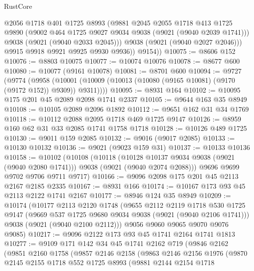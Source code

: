 \begin{lexlean}{RustCore}
\begin{coremodule}
              @2056
              @1718
              @401
              @1725
              @8993
              (@9881
                @2045
                @2055
                @1718
                @413
                @1725
                @9890
                (@9002 @464 @1725 @9027 @9034 @9038 (@9021 (@9040 @2039 @1741)))
                @9038
                (@9021 (@9040 @2033 @2045)))
              @9038
              (@9021 (@9040 @2027 @2046)))
            @9915
            @9918
            @9921
            @9925
            @9930
            @9936))
        @9154))
@10075 := @8606 @152
@10076 := @8803 @10075
@10077 := @10074 @10076
@10078 := @8677 @600
@10080 := @10077 (@9161 @10078)
@10081 := @8701 @600
@10094 := @9727
    (@9774
      (@9958 (@10001 (@10009 (@10013 (@10080 (@9165 @10081) (@9170 (@9172 @152)) @9309)) @9311))))
@10095 := @8931 @164
@10102 := @10095 @175 @201 @45 @2089 @2098 @1741 @2337
@10105 := @9644 @163 @35 @8949
@10108 := @10105 @2089 @2096 @1892
@10112 := @9651 @162 @31 @34 @1769
@10118 := @10112 @2088 @2095 @1718 @469 @1725 @9147
@10126 := @8959 @160 @62 @31 @33 @2085 @1741 @1758 @1718
@10128 := @10126 @489 @1725
@10130 := @9011 @159 @2085
@10132 := @9016 (@9017 @2085)
@10133 := @10130 @10132
@10136 := @9021 (@9023 @159 @31)
@10137 := @10133 @10136
@10158 := @10102
    (@10108
      (@10118
        (@10128 @10137 @9034 @9038 (@9021 (@9040 @2080 @1741)))
        @9038
        (@9021 (@9040 @2074 @2088)))
      @9696
      @9699
      @9702
      @9706
      @9711
      @9717)
@10166 := @9096 @2098 @175 @201 @45 @2113 @2167 @2185 @2335
@10167 := @8931 @166
@10174 := @10167 @173 @93 @45 @2113 @2122 @1741 @2167
@10177 := @8946 @124 @35 @8949
@10209 := @10174
    (@10177
      @2113
      @2120
      @1748
      (@9655
        @2112
        @2119
        @1718
        @530
        @1725
        @9147
        (@9669 @537 @1725 @9680 @9034 @9038 (@9021 (@9040 @2106 @1741)))
        @9038
        (@9021 (@9040 @2100 @2112)))
      @9056
      @9060
      @9065
      @9070
      @9076
      @9085)
@10217 := @9096 @2122 @173 @93 @45 @1741 @2164 @1741 @1813
@10277 := @9109
    @171
    @142
    @34
    @45
    @1741
    @2162
    @719
    (@9846
      @2162
      (@9851
        @2160
        @1758
        (@9857
          @2146
          @2158
          (@9863
            @2146
            @2156
            @1976
            (@9870
              @2145
              @2155
              @1718
              @552
              @1725
              @8993
              (@9881
                @2144
                @2154
                @1718

\end{coremodule}
\end{lexlean}

